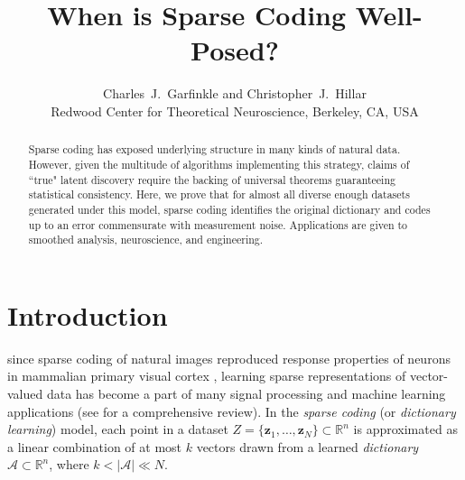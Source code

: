 \documentclass[journal, twocolumn]{IEEEtran}
\begin{document}
\title{When is Sparse Coding Well-Posed?}

\author{Charles~J.~Garfinkle and Christopher~J.~Hillar \\
Redwood Center for Theoretical Neuroscience, Berkeley, CA, USA
}
\maketitle

\begin{abstract}
Sparse coding has exposed underlying structure in many kinds of natural data.  However, given the multitude of algorithms implementing this strategy, claims of ``true" latent discovery require the backing of universal theorems guaranteeing statistical consistency.  Here, we prove that for almost all diverse enough datasets generated under this model, sparse coding identifies the original dictionary and codes up to an error commensurate with measurement noise. Applications are given to smoothed analysis, neuroscience, and engineering.
\end{abstract}



\section{Introduction}\label{Intro}
 since sparse coding of natural images reproduced response properties of neurons in mammalian primary visual cortex \cite{Olshausen96}, learning sparse representations of vector-valued data has become a part of many signal processing and machine learning applications (see \cite{Zhang15} for a comprehensive review). In the \textit{sparse coding} (or \emph{dictionary learning}) model, each point in a dataset $Z = \{\mathbf{z}_1, \ldots, \mathbf{z}_N\} \subset \mathbb{R}^n$ is approximated as a linear combination of at most $k$ vectors drawn from a learned \emph{dictionary} $\mathcal{A} \subset \mathbb{R}^n$, where $k < |\mathcal{A}| \ll N$. 
\end{document}
